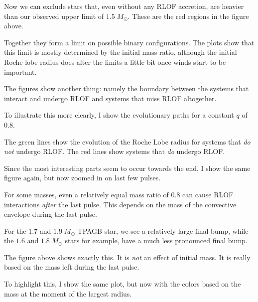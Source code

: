 \documentclass[a4paper,10pt]{article}
\begin{document}
\begin{figure}[ht]
    \centering
\end{figure}

Now we can exclude stars that, even without any RLOF accretion, are heavier than our observed upper limit of \(1.5\;M_\odot \). These are the red regions in the figure above.

Together they form a limit on possible binary configurations. The plots show that this limit is mostly determined by the initial mass ratio, although the initial Roche lobe radius does alter the limits a little bit once winds start to be important.

The figures show another thing: namely the boundary between the systems that interact and undergo RLOF and systems that miss RLOF altogether. 

\nextpage
To illustrate this more clearly, I show the evolutionary paths for a constant \(q\) of \(0.8\).
\begin{figure}[ht]
    \centering
\end{figure}
The green lines show the evolution of the Roche Lobe radius for systems that \emph{do not} undergo RLOF. The red lines show systems that \emph{do} undergo RLOF.

Since the most interesting parts seem to occur towards the end, I show the same figure again, but now zoomed in on last few pulses.
\begin{figure}[ht]
    \centering
\end{figure}

For some masses, even a relatively equal mass ratio of \(0.8\) can cause RLOF interactions \emph{after} the last pulse. This depends on the mass of the convective envelope during the last pulse.

For the \(1.7\) and \(1.9\;M_\odot \) TPAGB star, we see a relatively large final bump, while the \(1.6\) and \(1.8\;M_\odot \) stars for example, have a much less pronounced final bump.

\begin{figure}[ht]
    \centering
\end{figure}

The figure above shows exactly this. It is \emph{not} an effect of initial mass. It is really based on the mass left during the last pulse.

To highlight this, I show the same plot, but now with the colors based on the mass at the moment of the largest radius.
\end{document}
